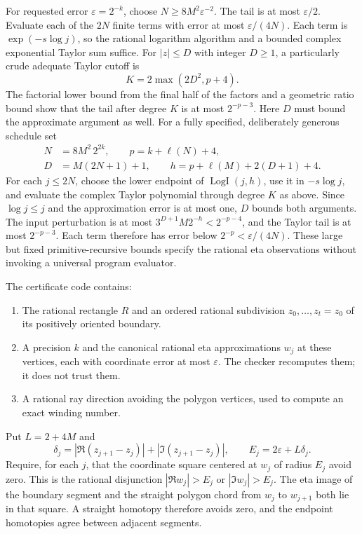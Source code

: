 For requested error $\varepsilon=2^{-k}$, choose
$N\ge8M^2\varepsilon^{-2}$. The tail is at most $\varepsilon/2$.
Evaluate each of the $2N$ finite terms with error at most
$\varepsilon/(4N)$. Each term is
$\exp(-s\log j)$, so the rational logarithm algorithm and a bounded
complex exponential Taylor sum suffice. For $|z|\le D$ with integer
$D\ge1$, a particularly crude adequate Taylor cutoff is
\[
 K=2\max(2D^2,p+4).
\]
The factorial lower bound from the final half of the factors and a
geometric ratio bound show that the tail after degree $K$ is at most
$2^{-p-3}$. Here $D$ must bound the approximate argument as well.
For a fully specified, deliberately generous schedule set
\[
 \begin{split}
 N&=8M^2\,2^{2k},\qquad p=k+\ell(N)+4,\\
 D&=M(2N+1)+1,\qquad
 h=p+\ell(M)+2(D+1)+4 .
 \end{split}
\]
For each $j\le2N$, choose the lower endpoint of
$\operatorname{LogI}(j,h)$, use it in $-s\log j$, and evaluate the
complex Taylor polynomial through degree $K$ as above. Since
$\log j\le j$ and the approximation error is at most one, $D$
bounds both arguments. The input perturbation is at most
$3^{D+1}M2^{-h}<2^{-p-4}$, and the Taylor tail is at most
$2^{-p-3}$. Each term therefore has error below
$2^{-p}<\varepsilon/(4N)$. These large but fixed
primitive-recursive bounds specify the rational eta observations
without invoking a universal program evaluator.

The certificate code contains:
\begin{enumerate}[leftmargin=*]
\item The rational rectangle $R$ and an ordered rational subdivision
$z_0,\ldots,z_t=z_0$ of its positively oriented boundary.
\item A precision $k$ and the canonical rational eta approximations
$w_j$ at these vertices, each with coordinate error at most
$\varepsilon$. The checker recomputes them; it does not trust them.
\item A rational ray direction avoiding the polygon vertices, used to
compute an exact winding number.
\end{enumerate}
Put $L=2+4M$ and
\[
 \delta_j=|\Re(z_{j+1}-z_j)|+|\Im(z_{j+1}-z_j)|,\qquad
 E_j=2\varepsilon+L\delta_j.
\]
Require, for each $j$, that the coordinate square centered at $w_j$
of radius $E_j$ avoid zero. This is the rational disjunction
$|\Re w_j|>E_j$ or $|\Im w_j|>E_j$.
The eta image of the boundary segment and the straight polygon chord
from $w_j$ to $w_{j+1}$ both lie in that square. A straight homotopy
therefore avoids zero, and the endpoint homotopies agree between
adjacent segments.

